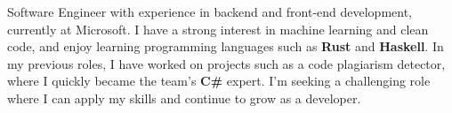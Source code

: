 
\begin{cvparagraph}

Software Engineer with experience in backend and front-end development, 
currently at Microsoft. 
I have a strong interest in machine learning and clean code, 
and enjoy learning programming languages such as \textbf{Rust} and \textbf{Haskell}. 
In my previous roles, I have worked on projects such as a code plagiarism detector,
where I quickly became the team's \textbf{C\#} expert. 
I'm seeking a challenging role where I can apply my skills 
and continue to grow as a developer.

\end{cvparagraph}